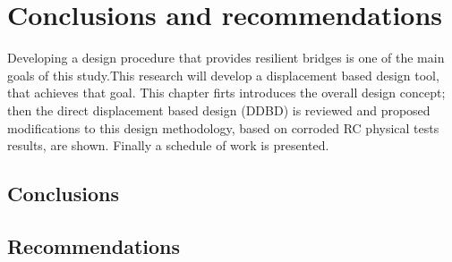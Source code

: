 \chapter{Conclusions and recommendations}

\label{chap-seven}

Developing a design procedure that provides resilient bridges is one of the main goals of this study.This research will develop a displacement based design tool, that achieves that goal. This chapter firts introduces the overall design concept; then the direct displacement based design (DDBD) is reviewed and proposed modifications to this design methodology, based on corroded RC physical tests results, are shown. Finally a schedule of work is presented.

\section{Conclusions}
\section{Recommendations}
